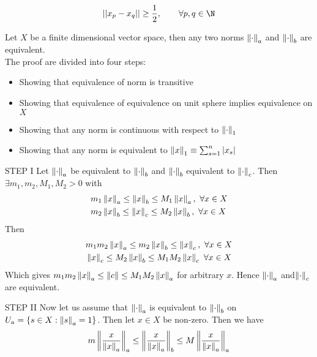 \documentclass{article}
\begin{document}
\begin{equation*}
    ||x_p-x_q|| \geq \frac{1}{2}, \qquad \forall p, q \in \N
\end{equation*}

\begin{theorem}\rm\nextline
	Let $X$ be a finite dimensional vector space, then any two norms $\left\|{\cdot}\right\|_a$ and $\left\|{\cdot}\right\|_b$ are equivalent.\\
	\prf The proof are divided into four steps:
	\begin{itemize}
		\item Showing that equivalence of norm is transitive
		\item Showing that equivalence of equivalence on unit sphere implies equivalence on $X$
		\item Showing that any norm is continuous with respect to $\left\|{\cdot}\right\|_1$
		\item Showing that any norm is equivalent to $\left\|{x}\right\|_1\equiv\sum_{s=1}^n |x_s|$
	\end{itemize}
	\begin{pf}{STEP I}{}
		Let $\left\|{\cdot}\right\|_a$ be equivalent to $\left\|{\cdot}\right\|_b$ and $\left\|{\cdot}\right\|_b$ equivalent to $\left\|{\cdot}\right\|_c$.
		Then $\exists m_1,m_2,M_1,M_2>0$ with
		\begin{equation}
			\begin{split}\nonumber
				&m_1\left\|{x}\right\|_a\leq \left\|{x}\right\|_b\leq M_1\left\|{x}\right\|_a,\,\,\forall x\in X\\
				&m_2\left\|{x}\right\|_b\leq \left\|{x}\right\|_c\leq M_2\left\|{x}\right\|_b,\,\,\forall x\in X
			\end{split}
		\end{equation}
		Then
		\begin{equation}
			\begin{split}\nonumber
				&m_1m_2\left\|{x}\right\|_a\leq m_2\left\|{x}\right\|_b\leq \left\|{x}\right\|_c,\,\,\forall x\in X\\
				&\left\|{x}\right\|_c\leq M_2\left\|{x}\right\|_b\leq M_1M_2\left\|{x}\right\|_c\,\,\forall x\in X
			\end{split}
		\end{equation}
		Which gives $m_1m_2\left\|{x}\right\|_a\leq\left\|{c}\right\|\leq M_1M_2\left\|{x}\right\|_a$ for arbitrary $x$. Hence $\left\|{\cdot}\right\|_a$ and$\left\|{\cdot}\right\|_c$ are equivalent.
	\end{pf}
	\begin{pf}{STEP II}{}
		Now let us assume that $\left\|{\cdot}\right\|_a$ is equivalent to $\left\|{\cdot}\right\|_b$ on $U_a=\{s\in X:\left\|{s}\right\|_a=1\}$.
		Then let $x\in X$ be non-zero. Then we have
		$$
			m\left\|{\frac{x}{\left\|{x}\right\|_a}}\right\|_a\leq \left\|{\frac{x}{\left\|{x}\right\|_a}}\right\|_b\leq M\left\|{\frac{x}{\left\|{x}\right\|_a}}\right\|_a
$$
\end{pf}
\end{theorem}
\end{document}
